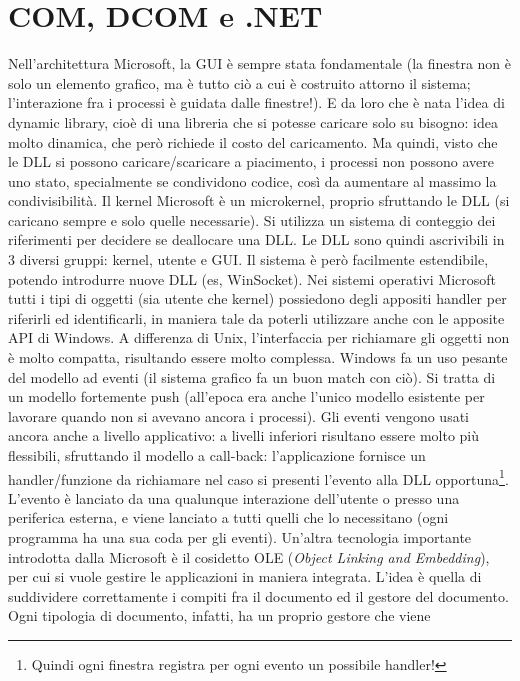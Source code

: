 \chapter{COM, DCOM e .NET}
Nell'architettura Microsoft, la GUI è sempre stata fondamentale (la finestra non è solo un elemento grafico, ma è tutto
ciò a cui è costruito attorno il sistema; l'interazione fra i processi è guidata dalle finestre!). E da loro che è nata
l'idea di dynamic library, cioè di una libreria che si potesse caricare solo su bisogno: idea molto dinamica, che però
richiede il costo del caricamento.
Ma quindi, visto che le DLL si possono caricare/scaricare a piacimento, i processi non possono avere uno stato,
specialmente se condividono codice, così  da aumentare al massimo la condivisibilità. Il kernel Microsoft è un
microkernel, proprio sfruttando le DLL (si caricano sempre e solo quelle necessarie).
Si utilizza un sistema di conteggio dei riferimenti per decidere se deallocare una DLL.
Le DLL sono quindi ascrivibili in 3 diversi gruppi: kernel, utente e GUI. Il sistema è però facilmente
estendibile, potendo introdurre nuove DLL (es, WinSocket).
Nei sistemi operativi Microsoft tutti i tipi di oggetti (sia utente che kernel) possiedono degli appositi handler per
riferirli ed identificarli, in maniera tale da poterli utilizzare anche con le apposite API di Windows. A differenza di
Unix, l'interfaccia per richiamare gli oggetti non è molto compatta, risultando essere molto complessa.
Windows fa un uso pesante del modello ad eventi (il sistema grafico fa un buon match con ciò). Si tratta di un modello
fortemente push (all'epoca era anche l'unico modello esistente per lavorare quando non si avevano ancora i processi).
Gli eventi vengono usati ancora anche a livello applicativo: a livelli inferiori risultano essere molto più flessibili,
sfruttando il modello a call-back: l'applicazione fornisce un handler/funzione da richiamare nel caso si presenti
l'evento alla DLL opportuna\footnote{Quindi ogni finestra registra per ogni evento un possibile handler!}. L'evento è
lanciato da una qualunque interazione dell'utente o presso una periferica esterna, e viene lanciato a tutti quelli che
lo necessitano (ogni programma ha una sua coda per gli eventi).
Un'altra tecnologia importante introdotta dalla Microsoft è il cosidetto OLE (\textit{Object Linking and Embedding}),
per cui si vuole gestire le applicazioni in maniera integrata. L'idea è quella di suddividere correttamente i compiti
fra il documento ed il gestore del documento. Ogni tipologia di documento, infatti, ha un proprio gestore che viene
